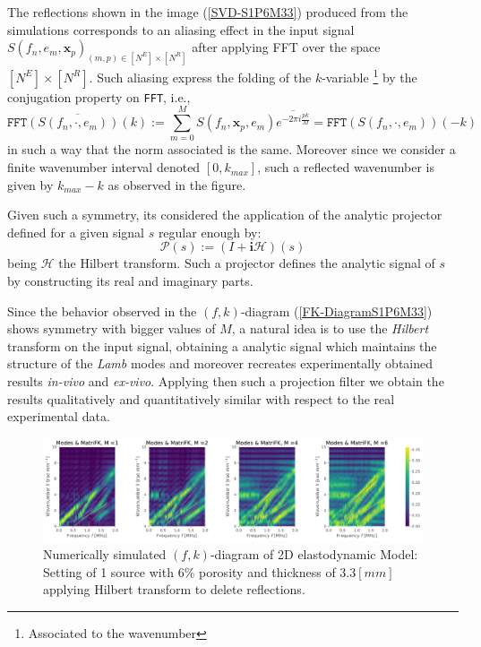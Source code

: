 The reflections shown in the image (\ref{SVD-S1P6M33}) produced from the simulations corresponds to an aliasing effect in the input signal $S(f_n, e_m, \mathbf{x}_p)_{(m,p) \in [N^E]\times [N^R]}$ after applying FFT over the space $[N^E] \times [N^R]$. Such aliasing express the folding of the $k$-variable \footnote{Associated to the wavenumber} by the conjugation property on \texttt{FFT}, i.e., 
\begin{equation*}
    \overline{\texttt{FFT}(S(f_n, \cdot, e_m))(k)} := \sum_{m=0}^M S(f_n, \mathbf{x}_p, e_m) \overline{e^{-2 \pi i \frac{p k}{M}}} = \texttt{FFT}(S(f_n, \cdot, e_m))(-k)
\end{equation*}
in such a way that the norm associated is the same. Moreover since we consider a finite wavenumber interval denoted $[0, k_{max}]$, such a reflected wavenumber is given by $k_{max}-k$ as observed in the figure.

Given such a symmetry, its considered the application of the analytic projector defined for a given signal $s$ regular enough by:
\begin{equation*}
    \mathcal{P}(s) := (I + \mathbf{i}\mathcal{H})(s)
\end{equation*}
being $\mathcal{H}$ the Hilbert transform. Such a projector defines the analytic signal of $s$ by constructing its real and imaginary parts.

Since the behavior observed in the $(f,k)$-diagram (\ref{FK-DiagramS1P6M33}) shows symmetry with bigger values of $M$, a natural idea is to use the \textit{Hilbert} transform on the input signal, obtaining a analytic signal which maintains the structure of the \textit{Lamb} modes and moreover recreates experimentally obtained results \textit{in-vivo} and \textit{ex-vivo}.
Applying then such a projection filter we obtain the results qualitatively and quantitatively similar with respect to the real experimental data.

\begin{figure}[!h]
	\centering
	\includegraphics[width=\textwidth]{images/TimeSingSous/2DTimeHilb_P6ElasticFK33M1460_y.pdf}
	\caption{Numerically simulated $(f,k)$-diagram of 2D elastodynamic Model: Setting of 1 source with $6\%$ porosity and thickness of $3.3 [mm]$ applying Hilbert transform to delete reflections.}
	\label{FK-Hil-DiagramS1P6M33}
\end{figure} 

